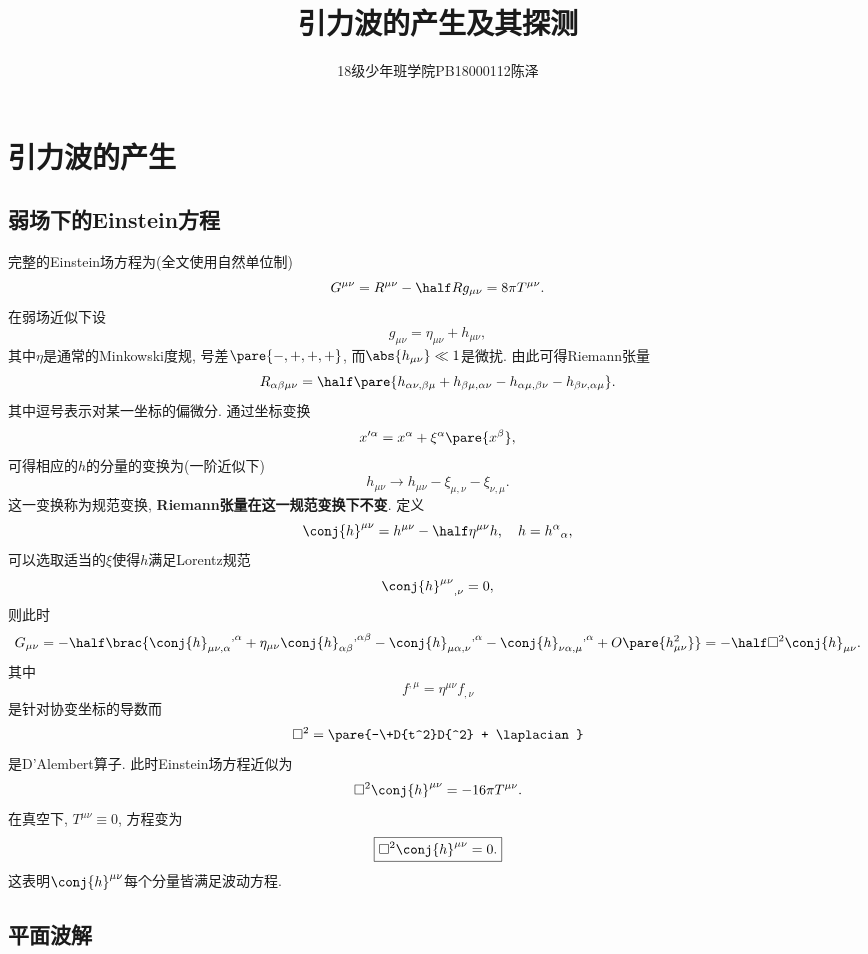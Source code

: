 \documentclass[hidelinks]{ctexart}
\title{引力波的产生及其探测}
\date{}
\author{18级少年班学院\quad PB18000112\quad 陈泽}
\begin{document}
\maketitle

\section{引力波的产生} %
\label{sec:引力波的产生}

\subsection{弱场下的Einstein方程} %
\label{sub:弱场下的einstein方程}

完整的Einstein场方程为(全文使用自然单位制)
\[ G^{\mu\nu} = R^{\mu\nu} - \half R g_{\mu\nu} = 8\pi T^{\mu\nu}. \]
在弱场近似下设
\[ g_{\mu\nu} = \eta_{\mu\nu} + h_{\mu\nu}, \]
其中$\eta$是通常的Minkowski度规, 号差$\pare{-,+,+,+}$, 而$\abs{h_{\mu\nu}}\ll 1$是微扰. 由此可得Riemann张量
\[ R_{\alpha\beta\mu\nu} = \half\pare{h_{\alpha\nu,\beta\mu} + h_{\beta\mu,\alpha\nu} - h_{\alpha\mu,\beta\nu} - h_{\beta\nu,\alpha\mu}}. \]
其中逗号表示对某一坐标的偏微分. 通过坐标变换
\[ x'^\alpha = x^\alpha + \xi^\alpha\pare{x^\beta}, \]
可得相应的$h$的分量的变换为(一阶近似下)
\[ h_{\mu\nu} \rightarrow h_{\mu\nu} - \xi_{\mu,\nu} - \xi_{\nu,\mu}. \]
这一变换称为规范变换, \textbf{Riemann张量在这一规范变换下不变}. 定义
\[ \conj{h}^{\mu\nu} = h^{\mu\nu} - \half \eta^{\mu\nu}h,\quad h = {h^\alpha}_\alpha, \]
可以选取适当的$\xi$使得$h$满足Lorentz规范
\[ {\conj{h}^{\mu\nu}}_{,\nu} = 0, \]
则此时
\[ G_{\mu\nu} = -\half\brac{ {\conj{h}_{\mu\nu,\alpha}}^{,\alpha} + \eta_{\mu\nu}{\conj{h}_{\alpha\beta}}^{,\alpha\beta} - {\conj{h}_{\mu\alpha,\nu}}^{,\alpha} - {\conj{h}_{\nu\alpha,\mu}}^{,\alpha} + O\pare{h_{\mu\nu}^2} } = -\half \Box^2 \conj{h}_{\mu\nu}. \]
其中
\[ f^{,\mu} = \eta^{\mu\nu}f_{,\nu} \]
是针对协变坐标的导数而
\[ \Box^2 = \pare{-\+D{t^2}D{^2} + \laplacian} \]
是D'Alembert算子. 此时Einstein场方程近似为
\[ \Box^2 \conj{h}^{\mu\nu} = -16\pi T^{\mu\nu}. \]
在真空下, $T^{\mu\nu} \equiv 0$, 方程变为
\[ \boxed{\Box^2 \conj{h}^{\mu\nu} = 0.} \]
这表明$\conj{h}^{\mu\nu}$每个分量皆满足波动方程.


\subsection{平面波解} %
\label{sub:平面波解}
\end{document}
